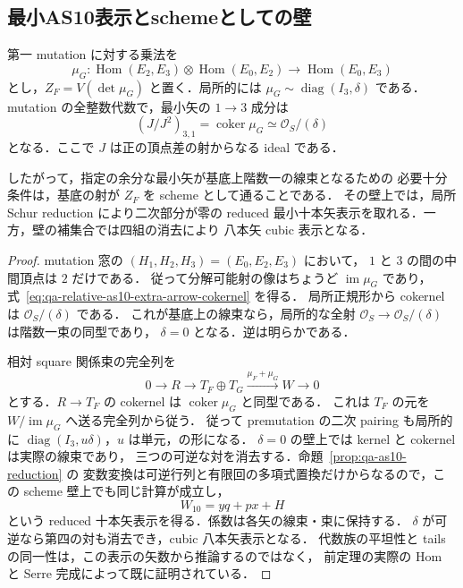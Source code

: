 \subsection{最小AS10表示とschemeとしての壁}
\label{subsec:qa-relative-minimal-as10-scheme-wall}

\begin{proposition}[最小矢束の平坦性はscheme壁を検出する]
\label{prop:qa-relative-as10-minimal-arrow-wall}
第一 mutation に対する乗法を
\[
 \mu_G:\operatorname{Hom}(E_2,E_3)\otimes\operatorname{Hom}(E_0,E_2)
             \longrightarrow\operatorname{Hom}(E_0,E_3)
\]
とし，$Z_F=V(\det\mu_G)$ と置く．局所的には
$\mu_G\sim\operatorname{diag}(I_3,\delta)$ である．
mutation の全整数代数で，最小矢の $1\to3$ 成分は
\[
 (J/J^2)_{3,1}=\operatorname{coker}\mu_G
                 \simeq\mathcal O_S/(\delta)
 \tag{MA}\label{eq:qa-relative-as10-extra-arrow-cokernel}
\]
となる．ここで $J$ は正の頂点差の射からなる ideal である．

したがって，指定の余分な最小矢が基底上階数一の線束となるための
必要十分条件は，基底の射が $Z_F$ を scheme として通ることである．
その壁上では，局所 Schur reduction により二次部分が零の reduced
最小十本矢表示を取れる．一方，壁の補集合では四組の消去により
八本矢 cubic 表示となる．
\end{proposition}
\begin{proof}
mutation 窓の $(H_1,H_2,H_3)=(E_0,E_2,E_3)$ において，
$1$ と $3$ の間の中間頂点は $2$ だけである．
従って分解可能射の像はちょうど $\operatorname{im}\mu_G$ であり，
式~\eqref{eq:qa-relative-as10-extra-arrow-cokernel} を得る．
局所正規形から cokernel は $\mathcal O_S/(\delta)$ である．
これが基底上の線束なら，局所的な全射
$\mathcal O_S\to\mathcal O_S/(\delta)$ は階数一束の同型であり，
$\delta=0$ となる．逆は明らかである．

相対 square 関係束の完全列を
\[
 0\longrightarrow R\longrightarrow T_F\oplus T_G
       \xrightarrow{\mu_F+\mu_G}W\longrightarrow0
\]
とする．$R\to T_F$ の cokernel は $\operatorname{coker}\mu_G$ と同型である．
これは $T_F$ の元を $W/\operatorname{im}\mu_G$ へ送る完全列から従う．
従って premutation の二次 pairing も局所的に
$\operatorname{diag}(I_3,u\delta)$，$u$ は単元，の形になる．
$\delta=0$ の壁上では kernel と cokernel は実際の線束であり，
三つの可逆な対を消去する．命題~\ref{prop:qa-as10-reduction} の
変数変換は可逆行列と有限回の多項式置換だけからなるので，この
scheme 壁上でも同じ計算が成立し，
\[
 W_{10}=yq+px+H
\]
という reduced 十本矢表示を得る．係数は各矢の線束・束に保持する．
$\delta$ が可逆なら第四の対も消去でき，cubic 八本矢表示となる．
代数族の平坦性と tails の同一性は，この表示の矢数から推論するのではなく，
前定理の実際の Hom と Serre 完成によって既に証明されている．
\end{proof}

